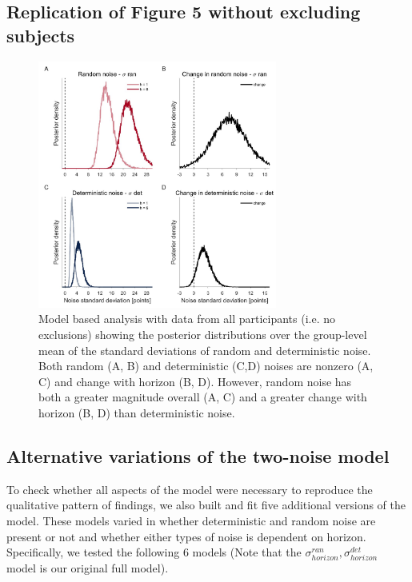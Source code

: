 \documentclass[12pt]{article}
\begin{document}
	\subsection{Replication of Figure 5 without excluding subjects}
	\begin{figure}[H]
		\begin{center}
			\includegraphics[width=0.7\textwidth]{figures/RDBayes_hyperprior__all.jpg}
			\caption{Model based analysis with data from all participants (i.e. no exclusions) showing the posterior distributions over the group-level mean of the standard deviations of  random and deterministic noise. Both random (A, B) and deterministic (C,D) noises are nonzero (A, C) and change with horizon (B, D).  However, random noise has both a greater magnitude overall (A, C) and a greater change with horizon (B, D) than deterministic noise.}
			\label{fig:s8}
		\end{center}
	\end{figure}
	\newpage
	\subsection{Alternative variations of the two-noise model}
	To check whether all aspects of the model were necessary to reproduce the qualitative pattern of findings, we also built and fit five additional versions of the model. These models varied in whether deterministic and random noise are present or not and whether either types of noise is dependent on horizon. Specifically, we tested the following 6 models (Note that the $\sigma^{ran}_{horizon},\sigma^{det}_{horizon}$ model is our original full model).
	
\end{document}
